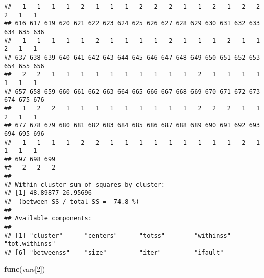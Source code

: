 \documentclass[]{article}
\newenvironment{Shaded}{\begin{snugshade}}{\end{snugshade}}
\newcommand{\DecValTok}[1]{\textcolor[rgb]{0.00,0.00,0.81}{#1}}
\newcommand{\KeywordTok}[1]{\textcolor[rgb]{0.13,0.29,0.53}{\textbf{#1}}}
\newcommand{\NormalTok}[1]{#1}
\begin{document}
\begin{verbatim}
##   1   1   1   1   2   1   1   1   2   2   2   1   1   2   1   2   2   2   1   1 
## 616 617 619 620 621 622 623 624 625 626 627 628 629 630 631 632 633 634 635 636 
##   1   1   1   1   1   2   1   1   1   1   2   1   1   1   2   1   1   2   1   1 
## 637 638 639 640 641 642 643 644 645 646 647 648 649 650 651 652 653 654 655 656 
##   2   2   1   1   1   1   1   1   1   1   1   1   2   1   1   1   1   1   1   1 
## 657 658 659 660 661 662 663 664 665 666 667 668 669 670 671 672 673 674 675 676 
##   1   2   2   1   1   1   1   1   1   1   1   1   2   2   2   1   1   2   1   1 
## 677 678 679 680 681 682 683 684 685 686 687 688 689 690 691 692 693 694 695 696 
##   1   1   1   1   2   2   1   1   1   1   1   1   1   1   1   2   1   1   1   1 
## 697 698 699 
##   2   2   2 
## 
## Within cluster sum of squares by cluster:
## [1] 48.89877 26.95696
##  (between_SS / total_SS =  74.8 %)
## 
## Available components:
## 
## [1] "cluster"      "centers"      "totss"        "withinss"     "tot.withinss"
## [6] "betweenss"    "size"         "iter"         "ifault"
\end{verbatim}

\begin{Shaded}
\begin{Highlighting}[]
\KeywordTok{func}\NormalTok{(vars[}\DecValTok{2}\NormalTok{])}
\end{Highlighting}
\end{Shaded}
\end{document}
